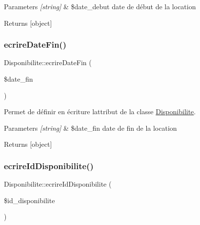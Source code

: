 \begin{DoxyParams}{Parameters}
{\em \mbox{[}string\mbox{]}} & \$date\+\_\+debut date de début de la location \\
\hline
\end{DoxyParams}
\begin{DoxyReturn}{Returns}
\mbox{[}object\mbox{]} 
\end{DoxyReturn}
\mbox{\label{class_disponibilite_ac17ef36cb1ff05e49a51ed98040b0ffc}} 
\subsubsection{\texorpdfstring{ecrire\+Date\+Fin()}{ecrireDateFin()}}
{\footnotesize\ttfamily Disponibilite\+::ecrire\+Date\+Fin (\begin{DoxyParamCaption}\item[{}]{\$date\+\_\+fin }\end{DoxyParamCaption})}



Permet de définir en écriture l\textquotesingle{}attribut de la classe \hyperlink{class_disponibilite}{Disponibilite}. 


\begin{DoxyParams}{Parameters}
{\em \mbox{[}string\mbox{]}} & \$date\+\_\+fin date de fin de la location \\
\hline
\end{DoxyParams}
\begin{DoxyReturn}{Returns}
\mbox{[}object\mbox{]} 
\end{DoxyReturn}
\mbox{\label{class_disponibilite_a0b085b75bdd83560abea34cb19dafb0c}} 
\subsubsection{\texorpdfstring{ecrire\+Id\+Disponibilite()}{ecrireIdDisponibilite()}}
{\footnotesize\ttfamily Disponibilite\+::ecrire\+Id\+Disponibilite (\begin{DoxyParamCaption}\item[{}]{\$id\+\_\+disponibilite }\end{DoxyParamCaption})}



